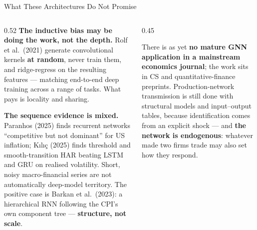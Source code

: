 \begin{frame}{What These Architectures Do Not Promise}
\begin{columns}[T]
\begin{column}{0.52\textwidth}
\small
\textbf{The inductive bias may be doing the work, not the depth.} Rolf et al.\ (2021) generate convolutional kernels \textbf{at random}, never train them, and ridge-regress on the resulting features --- matching end-to-end deep training across a range of tasks. What pays is locality and sharing.
\medskip

\textbf{The sequence evidence is mixed.} Paranhos (2025) finds recurrent networks ``competitive but not dominant'' for US inflation; K\i l\i\c{c} (2025) finds threshold and smooth-transition HAR beating LSTM and GRU on realised volatility. Short, noisy macro-financial series are not automatically deep-model territory. The positive case is Barkan et al.\ (2023): a hierarchical RNN following the CPI's own component tree --- \textbf{structure, not scale}.
\end{column}
\begin{column}{0.45\textwidth}
\begin{cautionbox}[title=\textbf{Graphs: an honest reading}]\small
There is as yet \textbf{no mature GNN application in a mainstream economics journal}; the work sits in CS and quantitative-finance preprints.
\medskip
Production-network transmission is still done with structural models and input--output tables, because identification comes from an explicit shock --- and \textbf{the network is endogenous}: whatever made two firms trade may also set how they respond.
\end{cautionbox}
\end{column}
\end{columns}
\vspace{1mm}
\end{frame}

